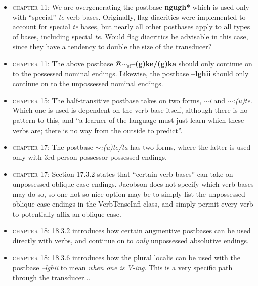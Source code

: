 \documentclass{article}
\begin{document}
\begin{itemize}
\renewcommand\labelitemi{$\cdot$}

\item \textsc{chapter 11}: We are overgenerating the postbase \textbf{ngugh*} which is used only with ``special'' \textit{te} verb bases.
%
Originally, flag diacritics were implemented to account for special \textit{te} bases, but nearly all other postbases apply to all types of bases, including special \textit{te}.
%
Would flag diacritics be advisable in this case, since they have a tendency to double the size of the transducer?

\item \textsc{chapter 11}: The above postbase \textbf{@$\sim_\text{sf}$--(g)ke/(g)ka} should only continue on to the possessed nominal endings.
%
Likewise, the postbase \textbf{--lghii} should only continue on to the unpossessed nominal endings.

\item \textsc{chapter 15}: The half-transitive postbase takes on two forms, \textit{$\sim$i} and \textit{$\sim$:(u)te}.
%
Which one is used is dependent on the verb base itself, although there is no pattern to this, and ``a learner of the language must just learn which these verbs are; there is no way from the outside to predict''.

\item \textsc{chapter 17}: The postbase \textit{$\sim$:(u)te/ta} has two forms, where the latter is used only with 3rd person possessor possessed endings.

\item \textsc{chapter 17}: Section 17.3.2 states that ``certain verb bases'' can take on unpossessed oblique case endings.
%
Jacobson does not specify which verb bases may do so, so one not so nice option may be to simply list the unpossessed oblique case endings in the VerbTenseInfl class, and simply permit every verb to potentially affix an oblique case.

\item \textsc{chapter 18}: 18.3.2 introduces how certain augmentive postbases can be used directly with verbs, and continue on to \textit{only} unpossessed absolutive endings.

\item \textsc{chapter 18}: 18.3.6 introduces how the plural localis can be used with the postbase \textit{--lghii} to mean \textit{when one is V-ing}.
%
This is a very specific path through the transducer...

\end{itemize}
\end{document}
